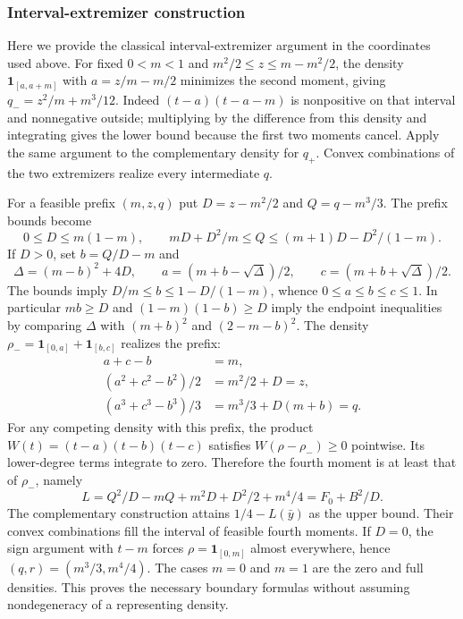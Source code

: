 \documentclass[pdflatex,sn-mathphys-num]{sn-jnl}
\theoremstyle{thmstyleone}
\theoremstyle{thmstyletwo}\newtheorem{remark}[theorem]{Remark}
\begin{document}
\subsubsection{Interval-extremizer construction}\label{app:boundary}
Here we provide the classical interval-extremizer argument in the coordinates
used above. For fixed $0<m<1$ and $m^2/2\le z\le m-m^2/2$, the density
$\mathbf1_{[a,a+m]}$ with $a=z/m-m/2$ minimizes the second moment, giving
$q_-=z^2/m+m^3/12$. Indeed $(t-a)(t-a-m)$ is nonpositive on that interval
and nonnegative outside; multiplying by the difference from this density
and integrating gives the lower bound because the first two moments cancel.
Apply the same argument to the complementary density for $q_+$.
Convex combinations of the two extremizers realize every intermediate $q$.

For a feasible prefix $(m,z,q)$ put $D=z-m^2/2$ and $Q=q-m^3/3$.
The prefix bounds become
\[
 0\le D\le m(1-m),\qquad
 mD+D^2/m\le Q\le(m+1)D-D^2/(1-m).
\]
If $D>0$, set $b=Q/D-m$ and
\[
 \Delta=(m-b)^2+4D,\qquad
 a=(m+b-\sqrt\Delta)/2,\qquad
 c=(m+b+\sqrt\Delta)/2.
\]
The bounds imply $D/m\le b\le1-D/(1-m)$, whence
$0\le a\le b\le c\le1$. In particular $mb\ge D$ and
$(1-m)(1-b)\ge D$ imply the endpoint inequalities by comparing
$\Delta$ with $(m+b)^2$ and $(2-m-b)^2$.
The density $\rho_- =\mathbf1_{[0,a]}+\mathbf1_{[b,c]}$ realizes the prefix:
\begin{align*}
 a+c-b&=m,\\
 (a^2+c^2-b^2)/2&=m^2/2+D=z,\\
 (a^3+c^3-b^3)/3&=m^3/3+D(m+b)=q.
\end{align*}
For any competing density with this prefix, the product
$W(t)=(t-a)(t-b)(t-c)$ satisfies $W(\rho-\rho_-)\ge0$ pointwise.
Its lower-degree terms integrate to zero. Therefore the fourth moment is
at least that of $\rho_-$, namely
\[
 L=Q^2/D-mQ+m^2D+D^2/2+m^4/4=F_0+B^2/D.
\]
The complementary construction attains $1/4-L(\bar y)$ as the upper bound.
Their convex combinations fill the interval of feasible fourth moments.
If $D=0$, the sign argument with $t-m$ forces
$\rho=\mathbf1_{[0,m]}$ almost everywhere, hence
$(q,r)=(m^3/3,m^4/4)$. The cases $m=0$ and $m=1$ are the zero and full
densities. This proves the necessary boundary formulas without assuming
nondegeneracy of a representing density.
\end{document}

